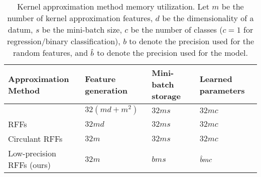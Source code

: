\begin{table}
	\caption{Kernel approximation method memory utilization. Let $m$ be the number of kernel approximation features, $d$ be the dimensionality of a datum, $s$ be the mini-batch size, $c$ be the number of classes ($c=1$ for regression/binary classification), $b$ to denote the precision used for the random features, and $\hat{b}$ to denote the precision used for the model.}
	\label{table:mem-usage}
	\centering
	\begin{tabular}{llll}
		\toprule
		Approximation Method & Feature generation & Mini-batch storage & Learned parameters \\
		\midrule
		\Nystrom \citep{nystrom} & $32(md + m^2)$ & $32ms$ & $32mc$ \\
		RFFs \citep{rahimi07random} &  $32md$ & $32ms$ & $32mc$ \\
		Circulant RFFs \citep{yu15} & $32m$ & $32ms$ & $32mc$ \\
		Low-precision RFFs (ours)& $32m$ & $bms$ & $\hat{b} mc$ \\
		\bottomrule
	\end{tabular}
\end{table}

